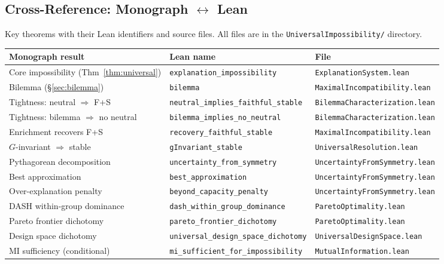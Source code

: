 \subsection{Cross-Reference: Monograph $\leftrightarrow$ Lean}
\label{sec:cross-ref}

{\raggedright\noindent Key theorems with their Lean identifiers and source files.
All files are in the \texttt{UniversalImpossibility/} directory.\par}

{\small
\setlength{\tabcolsep}{4pt}\begin{longtable}{@{}p{4.5cm}p{5.2cm}p{5.2cm}@{}}
\toprule
Monograph result & Lean name & File \\
\midrule
\endhead
Core impossibility (Thm~\ref{thm:universal}) & \texttt{explanation\_impossibility} & \texttt{ExplanationSystem.lean} \\
Bilemma (\S\ref{sec:bilemma}) & \texttt{bilemma} & \texttt{MaximalIncompatibility.lean} \\
Tightness: neutral $\Rightarrow$ F+S & \texttt{neutral\_implies\_faithful\_stable} & \texttt{BilemmaCharacterization.lean} \\
Tightness: bilemma $\Rightarrow$ no neutral & \texttt{bilemma\_implies\_no\_neutral} & \texttt{BilemmaCharacterization.lean} \\
Enrichment recovers F+S & \texttt{recovery\_faithful\_stable} & \texttt{MaximalIncompatibility.lean} \\
$G$-invariant $\Rightarrow$ stable & \texttt{gInvariant\_stable} & \texttt{UniversalResolution.lean} \\
Pythagorean decomposition & \texttt{uncertainty\_from\_symmetry} & \texttt{UncertaintyFromSymmetry.lean} \\
Best approximation & \texttt{best\_approximation} & \texttt{UncertaintyFromSymmetry.lean} \\
Over-explanation penalty & \texttt{beyond\_capacity\_penalty} & \texttt{UncertaintyFromSymmetry.lean} \\
DASH within-group dominance & \texttt{dash\_within\_group\_dominance} & \texttt{ParetoOptimality.lean} \\
Pareto frontier dichotomy & \texttt{pareto\_frontier\_dichotomy} & \texttt{ParetoOptimality.lean} \\
Design space dichotomy & \texttt{universal\_design\_space\_dichotomy} & \texttt{UniversalDesignSpace.lean} \\
MI sufficiency (conditional) & \texttt{mi\_sufficient\_for\_impossibility} & \texttt{MutualInformation.lean} \\

\end{longtable}}
